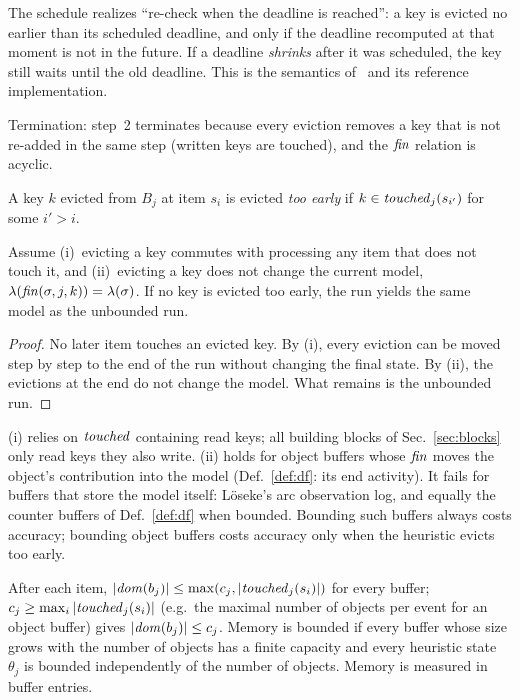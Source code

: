 The schedule realizes ``re-check when the deadline is reached'': a key is
evicted no earlier than its scheduled deadline, and only if the deadline
recomputed at that moment is not in the future. If a deadline \emph{shrinks}
after it was scheduled, the key still waits until the old deadline. This is
the semantics of~\cite{Muehlmeyer2026} and its reference implementation.

Termination: step~2 terminates because every eviction removes a key that is
not re-added in the same step (written keys are touched), and the $\mathit{fin}$
relation is acyclic.

\begin{definition}\label{def:premature}
A key $k$ evicted from $B_j$ at item $s_i$ is evicted \emph{too early} if
$k \in \mathit{touched}_j(s_{i'})$ for some $i' > i$.
\end{definition}

\begin{proposition}[Exactness]\label{prop:exact}
Assume
(i)~evicting a key commutes with processing any item that does not touch it, and
(ii)~evicting a key does not change the current model,
$\lambda(\mathit{fin}(\sigma, j, k)) = \lambda(\sigma)$.
If no key is evicted too early, the run yields the same model as the
unbounded run.
\end{proposition}
\begin{proof}
No later item touches an evicted key. By (i), every eviction can be moved
step by step to the end of the run without changing the final state. By (ii),
the evictions at the end do not change the model. What remains is the
unbounded run.
\end{proof}

\begin{remark}\label{rem:exactness}
(i) relies on $\mathit{touched}$ containing read keys; all building blocks of
Sec.~\ref{sec:blocks} only read keys they also write.
(ii) holds for object buffers whose $\mathit{fin}$ moves the object's contribution into
the model (Def.~\ref{def:df}: its end activity). It fails for buffers that
store the model itself: Löseke's arc observation log, and equally the counter
buffers of Def.~\ref{def:df} when bounded. Bounding such buffers always costs
accuracy; bounding object buffers costs accuracy only when the heuristic
evicts too early.
\end{remark}

\begin{remark}[Memory]\label{rem:memory}
After each item, $|\mathit{dom}(b_j)| \le \max(c_j, |\mathit{touched}_j(s_i)|)$ for every
buffer; $c_j \ge \max_i |\mathit{touched}_j(s_i)|$ (e.g.\ the maximal number of objects
per event for an object buffer) gives $|\mathit{dom}(b_j)| \le c_j$.
Memory is bounded if every buffer whose size grows with the number of objects
has a finite capacity and every heuristic state $\theta_j$ is bounded
independently of the number of objects. Memory is measured in buffer entries.
\end{remark}

